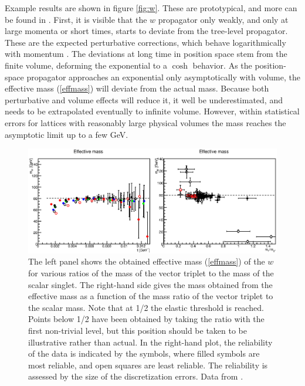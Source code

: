 \documentclass[final,12pt,3p,longtitle]{elsarticle}
\newcommand*{\pref}[1]{(\ref{#1})}
\newcommand*{\1}{1\!\!\!\bot}
\begin{document}
Example results are shown in figure \ref{fig:w}. These are prototypical, and more can be found in  \cite{Maas:2013aia,Maas:unpublished,Maas:2012tj,Maas:2010nc}. First, it is visible that the $w$ propagator only weakly, and only at large momenta or short times, starts to deviate from the tree-level propagator. These are the expected perturbative corrections, which behave logarithmically with momentum \cite{Bohm:2001yx}. The deviations at long time in position space stem from the finite volume, deforming the exponential to a $\cosh$ behavior. As the position-space propagator approaches an exponential only asymptotically with volume, the effective mass \pref{effmass} will deviate from the actual mass. Because both perturbative and volume effects will reduce it, it well be underestimated, and needs to be extrapolated eventually to infinite volume. However, within statistical errors for lattices with reasonably large physical volumes the mass reaches the asymptotic limit up to a few GeV.

\begin{figure}
\includegraphics[width=\linewidth]{w-mass}
\caption{\label{fig:wmass}The left panel shows the obtained effective mass \pref{effmass} of the $w$ for various ratios of the mass of the vector triplet to the mass of the scalar singlet. The right-hand side gives the mass obtained from the effective mass as a function of the mass ratio of the vector triplet to the scalar mass. Note that at 1/2 the elastic threshold is reached. Points below 1/2 have been obtained by taking the ratio with the first non-trivial level, but this position should be taken to be illustrative rather than actual. In the right-hand plot, the reliability of the data is indicated by the symbols, where filled symbols are most reliable, and open squares are least reliable. The reliability is assessed by the size of the discretization errors. Data from \cite{Maas:2013aia,Maas:unpublished}.}
\end{figure}
\end{document}

